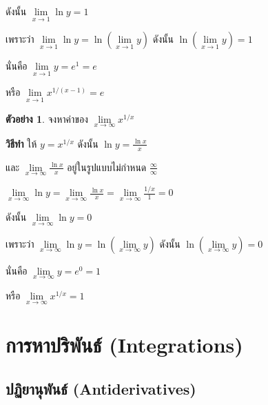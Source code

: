\documentclass[
]{book}
\theoremstyle{definition}
\theoremstyle{definition}
\newtheorem{example}{ตัวอย่าง}[chapter]
\theoremstyle{definition}
\theoremstyle{definition}
\theoremstyle{remark}
\begin{document}
ดังนั้น \(\mathop {\lim }\limits_{x\to 1} \ln y=1\)

เพราะว่า \(\mathop {\lim }\limits_{x\to 1} \ln y=\ln (\mathop {\lim
}\limits_{x\to 1} y)\) ดังนั้น \(\ln (\mathop {\lim }\limits_{x\to 1} y)=1\)

นั่นคือ \(\mathop {\lim }\limits_{x\to 1} y=e^1=e\)

หรือ \(\mathop {\lim }\limits_{x\to 1} x^{1/(x-1)}=e\)

\begin{example}
จงหาค่าของ \(\mathop {\lim }\limits_{x\to \infty } x^{1/x}\)
\end{example}

\textbf{วิธีทำ} ให้ \(y=x^{1/x}\) ดังนั้น \(\displaystyle \ln y=\frac{\ln x}{x}\)

และ
\(\displaystyle \mathop {\lim }\limits_{x\to \infty } \frac{\ln x}{x}\)
อยู่ในรูปแบบไม่กำหนด \(\displaystyle \frac{\infty }{\infty }\)

\(\displaystyle \mathop {\lim }\limits_{x\to \infty } \ln y=\mathop {\lim
}\limits_{x\to
\infty } \frac{\ln x}{x}=\mathop {\lim }\limits_{x\to \infty }
\frac{1/x}{1}=0\)

ดังนั้น \(\mathop {\lim }\limits_{x\to \infty } \ln y=0\)

เพราะว่า \(\mathop {\lim }\limits_{x\to \infty } \ln y=\ln (\mathop {\lim
}\limits_{x\to \infty } y)\) ดังนั้น \(\ln (\mathop {\lim }\limits_{x\to
\infty } y)=0\)

นั่นคือ \(\mathop {\lim }\limits_{x\to \infty } y=e^0=1\)

หรือ \(\mathop {\lim }\limits_{x\to \infty } x^{1/x}=1\)




\chapter{การหาปริพันธ์ (Integrations)}\label{uxe01uxe32uxe23uxe2buxe32uxe1buxe23uxe1euxe19uxe18-integrations}

\section{ปฏิยานุพันธ์ (Antiderivatives)}\label{uxe1buxe0fuxe22uxe32uxe19uxe1euxe19uxe18-antiderivatives}
\end{document}
